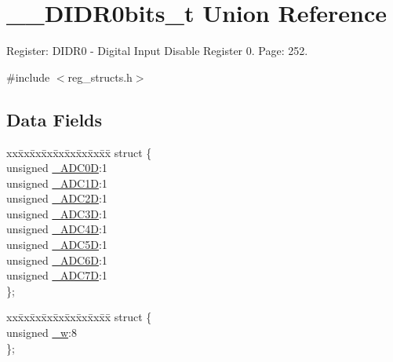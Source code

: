 \hypertarget{union_____d_i_d_r0bits__t}{\section{\+\_\+\+\_\+\+D\+I\+D\+R0bits\+\_\+t Union Reference}
\label{union_____d_i_d_r0bits__t}
}


Register\+: D\+I\+D\+R0 -\/ Digital Input Disable Register 0. Page\+: 252.  




{\ttfamily \#include $<$reg\+\_\+structs.\+h$>$}

\subsection*{Data Fields}
\begin{DoxyCompactItemize}
\item 
\begin{tabbing}
xx\=xx\=xx\=xx\=xx\=xx\=xx\=xx\=xx\=\kill
struct \{\\
\>unsigned \hyperlink{union_____d_i_d_r0bits__t_a448e66d4d8b6a92ceab81a378624dbc0}{\_ADC0D}:1\\
\>unsigned \hyperlink{union_____d_i_d_r0bits__t_af3db2ed35abd787a2516c4fb4235d921}{\_ADC1D}:1\\
\>unsigned \hyperlink{union_____d_i_d_r0bits__t_a3b2f7278ddcc429c2233a10814729776}{\_ADC2D}:1\\
\>unsigned \hyperlink{union_____d_i_d_r0bits__t_a9bff4153a1207fbc1aa78e0cabc62684}{\_ADC3D}:1\\
\>unsigned \hyperlink{union_____d_i_d_r0bits__t_a1a81c3fa80c7727407d9c9473c1586c6}{\_ADC4D}:1\\
\>unsigned \hyperlink{union_____d_i_d_r0bits__t_afac4c7e27c681728794af58fa5d94a4c}{\_ADC5D}:1\\
\>unsigned \hyperlink{union_____d_i_d_r0bits__t_ac2001b8027266277149204eb8db5a6dc}{\_ADC6D}:1\\
\>unsigned \hyperlink{union_____d_i_d_r0bits__t_ad8b0903c038e95899497c2c463e09ff8}{\_ADC7D}:1\\
\}; \\

\end{tabbing}\item 
\begin{tabbing}
xx\=xx\=xx\=xx\=xx\=xx\=xx\=xx\=xx\=\kill
struct \{\\
\>unsigned \hyperlink{union_____d_i_d_r0bits__t_abec234de65b83769f89486810f8237fe}{\_w}:8\\
\}; \\

\end{tabbing}\end{DoxyCompactItemize}


